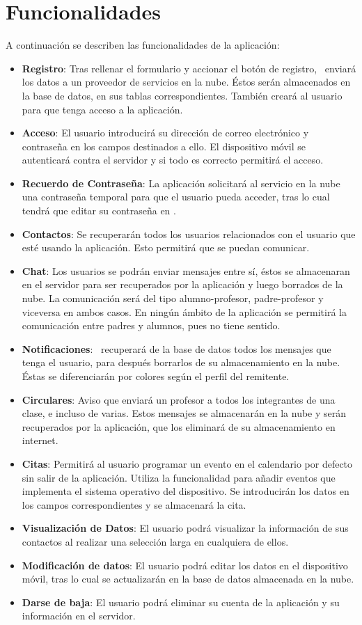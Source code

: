 	\section{Funcionalidades}
		A continuación se describen las funcionalidades de la aplicación:
		\begin{itemize} 
			\item {\bf Registro}: Tras rellenar el formulario y accionar el botón de registro, \CollegeApp\ enviará los datos a un proveedor de servicios en la nube. Éstos serán almacenados en la base de datos, en sus tablas correspondientes. También creará al usuario para que tenga acceso a la aplicación.
			\item {\bf Acceso}: El usuario introducirá su dirección de correo electrónico y contraseña en los campos destinados a ello. El dispositivo móvil se autenticará contra el servidor y si todo es correcto permitirá el acceso.
			\item {\bf Recuerdo de Contraseña}: La aplicación solicitará al servicio en la nube una contraseña temporal para que el usuario pueda acceder, tras lo cual tendrá que editar su contraseña en \CollegeApp.
			\item {\bf Contactos}: Se recuperarán todos los usuarios relacionados con el usuario que esté usando la aplicación. Esto permitirá que se puedan comunicar.
			\item {\bf Chat}: Los usuarios se podrán enviar mensajes entre sí, éstos se almacenaran en el servidor para ser recuperados por la aplicación y luego borrados de la nube. La comunicación será del tipo alumno-profesor, padre-profesor y viceversa en ambos casos. En ningún ámbito de la aplicación se permitirá la comunicación entre padres y alumnos, pues no tiene sentido.
			\item {\bf Notificaciones}: \CollegeApp\ recuperará de la base de datos todos los mensajes que tenga el usuario, para después borrarlos de su almacenamiento en la nube. Éstas se diferenciarán por colores según el perfil del remitente.
			\item {\bf Circulares}: Aviso que enviará un profesor a todos los integrantes de una clase, e incluso de varias. Estos mensajes se almacenarán en la nube y serán recuperados por la aplicación, que los eliminará de su almacenamiento en internet.
			\item {\bf Citas}: Permitirá al usuario programar un evento en el calendario por defecto sin salir de la aplicación. Utiliza la funcionalidad para añadir eventos que implementa el sistema operativo del dispositivo. Se introducirán los datos en los campos correspondientes y se almacenará la cita.
			\item {\bf Visualización de Datos}: El usuario podrá visualizar la información de sus contactos al realizar una selección larga en cualquiera de ellos.
			\item {\bf Modificación de datos}: El usuario podrá editar los datos en el dispositivo móvil, tras lo cual se actualizarán en la base de datos almacenada en la nube. 
			\item {\bf Darse de baja}: El usuario podrá eliminar su cuenta de la aplicación y su información en el servidor.
		\end{itemize}

